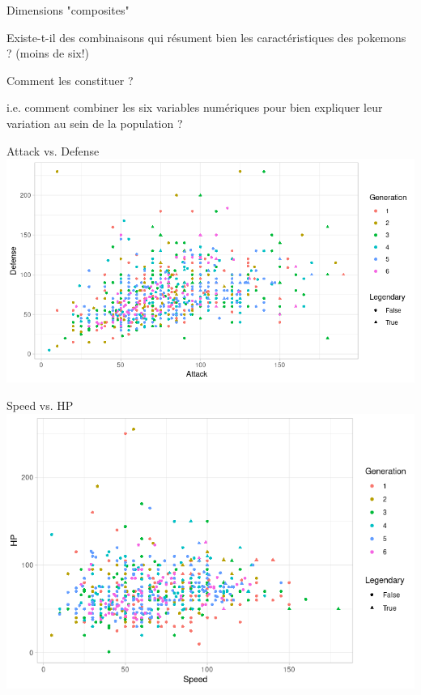 \documentclass{beamer}
\begin{document}
\begin{frame}{Dimensions "composites"}


Existe-t-il des combinaisons qui \alert{résument bien} les caractéristiques des pokemons ? (moins de six!)

\medskip \medskip

Comment les constituer ? 

\medskip \medskip

i.e. comment \alert{combiner} les six variables numériques pour bien \alert{expliquer leur variation} au sein de la population ? 



\end{frame}

\begin{frame}{Attack vs. Defense}
\centering
\includegraphics[width=\textwidth,keepaspectratio]{img/Attack_Defense.png}
\end{frame}


\begin{frame}{Speed vs. HP}
\centering
\includegraphics[width=\textwidth,keepaspectratio]{img/Speed_HP.png}
\end{frame}
\end{document}
